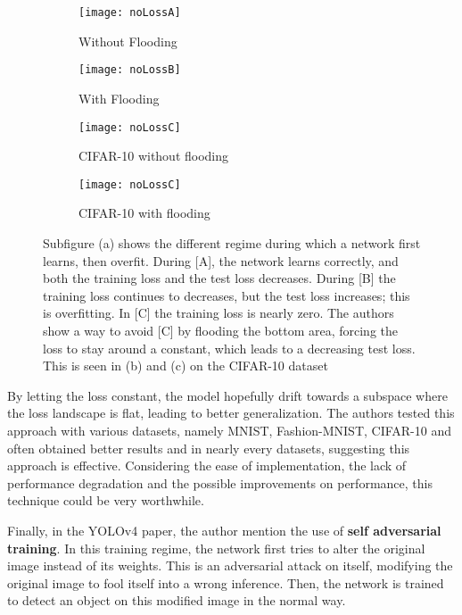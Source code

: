 \begin{figure}[H]
	\begin{subfigure}[t]{.24\textwidth}
  \centering
  \texttt{[image: noLossA]}  
  \caption{Without Flooding}
  \label{fig:lossA}
\end{subfigure}
	\begin{subfigure}[t]{.24\textwidth}
  \centering
  \texttt{[image: noLossB]}  
  \caption{With Flooding}
  \label{fig:lossB}
\end{subfigure}
	\begin{subfigure}[t]{.24\textwidth}
  \centering
  \texttt{[image: noLossC]}  
  \caption{CIFAR-10 without flooding}
  \label{fig:lossC}
\end{subfigure}
	\begin{subfigure}[t]{.24\textwidth}
  \centering
  \texttt{[image: noLossC]}  
  \caption{CIFAR-10 with flooding}
  \label{fig:lossD}
\end{subfigure}
	\caption{Subfigure (a) shows the different regime during which a network first learns, then overfit. During [A], the network learns correctly, and both the training loss and the test loss decreases. During [B] the training loss continues to decreases, but the test loss increases; this is overfitting. In [C] the training loss is nearly zero. The authors show a way to avoid [C] by flooding the bottom area, forcing the loss to stay around a constant, which leads to a decreasing test loss. This is seen in (b) and (c) on the CIFAR-10 dataset}
\label{fig:}
\end{figure}

By letting the loss constant, the model hopefully drift towards a subspace where the loss landscape is flat, leading to better generalization. The authors tested this approach with various datasets, namely MNIST\cite{mnist}, Fashion-MNIST\cite{fashionMNIST}, CIFAR-10\cite{cifar} and often obtained better results and in nearly every datasets, suggesting this approach is effective. Considering the ease of implementation, the lack of performance degradation and the possible improvements on performance, this technique could be very worthwhile.

Finally, in the YOLOv4\cite{yolov4} paper, the author mention the use of \textbf{self adversarial training}. In this training regime, the network first tries to alter the original image instead of its weights. This is an adversarial attack on itself, modifying the original image to fool itself into a wrong inference. Then, the network is trained to detect an object on this modified image in the normal way.

